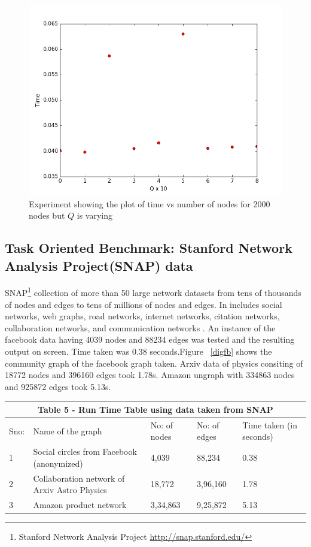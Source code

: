 \begin{figure}[H]
\centering
\includegraphics[scale=0.3]{varq2000pio3.png}
\caption{\label{ex6}Experiment showing the plot of time vs number of nodes for 2000 nodes but $Q$ is varying }
\end{figure}


\subsection{Task Oriented Benchmark: Stanford Network Analysis Project(SNAP) data}
SNAP\footnote{Stanford Network Analysis Project \url{http://snap.stanford.edu/}} collection of more than 50 large network datasets from tens of thousands of nodes and edges to tens of millions of nodes and edges. In includes social networks, web graphs, road networks, internet networks, citation networks, collaboration networks, and communication networks \cite{snap}. An instance of the facebook data having 4039 nodes and 88234 edges was tested and the resulting output on screen. Time taken was 0.38 seconds.Figure ~\ref{digfb} shows the community graph of the facebook graph taken. Arxiv data of physics consiting of 18772 nodes and  396160 edges took 1.78s. Amazon ungraph with 334863 nodes  and 925872 edges took 5.13s.
\begin{table}[H]
\centering
\begin{tabular}{|p{1cm}||p{3cm}|p{2cm}|p{3cm}|p{3cm}|}
 \hline
 \multicolumn{5}{|c|}{Table 5 - Run Time Table using data taken from SNAP} \\
 \hline
 Sno: & Name of the graph &No: of nodes &No: of edges &Time taken (in seconds)\\
 \hline
1   & Social circles from Facebook (anonymized)  &4,039 &  88,234& 0.38  \\
2   & Collaboration network of Arxiv Astro Physics  &18,772 &  3,96,160 & 1.78 \\
3   & Amazon product network  &3,34,863 &  9,25,872  & 5.13 \\
\hline

\end{tabular}
\end{table}


